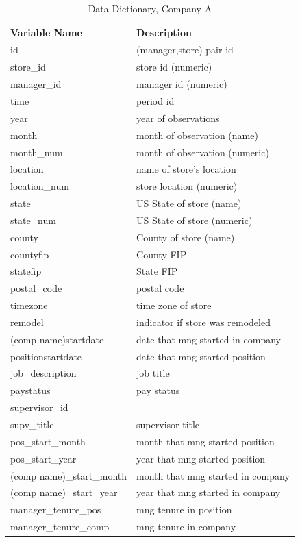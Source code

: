 \documentclass[
]{article}
\begin{document}
\clearpage 
\appendix

\begin{longtable}{ll} \caption{Data Dictionary, Company A} \label{tab:data_dictionaryA} \\ \toprule
Variable Name & Description \\ \hline 
id & (manager,store) pair id \\
store\_id & store id (numeric) \\
manager\_id & manager id (numeric) \\
time & period id \\
year & year of observations \\
month & month of observation (name)  \\
month\_num & month of observation (numeric) \\
location & name of store's location \\
location\_num & store location (numeric)  \\
state & US State of store (name) \\
state\_num & US State of store (numeric)  \\
county & County of store (name)  \\
countyfip & County FIP  \\
statefip & State FIP  \\
postal\_code & postal code  \\
timezone & time zone of store \\
remodel & indicator if store was remodeled  \\
(comp name)startdate & date that mng started in company \\
positionstartdate & date that mng started position \\
job\_description & job title  \\
paystatus & pay status  \\
supervisor\_id &  \\
supv\_title & supervisor title  \\
pos\_start\_month & month that mng started position  \\
pos\_start\_year & year that mng started position  \\
(comp name)\_start\_month & month that mng started in company  \\
(comp name)\_start\_year & year that mng started in company  \\
manager\_tenure\_pos & mng tenure in position  \\
manager\_tenure\_comp & mng tenure in company  \\

\end{longtable}
\end{document}

